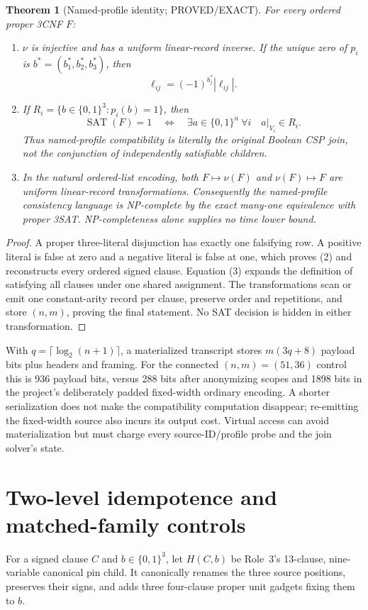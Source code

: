 \documentclass[11pt]{article}
\newtheorem{theorem}{Theorem}
\newcommand{\SAT}{\operatorname{SAT}}
\begin{document}
\begin{theorem}[Named-profile identity; PROVED/EXACT]
For every ordered proper 3CNF $F$:
\begin{enumerate}
\item $\nu$ is injective and has a uniform linear-record inverse.  If the
unique zero of $p_i$ is $b^*=(b_1^*,b_2^*,b_3^*)$, then
\[
 \ell_{ij}=(-1)^{b_j^*}|\ell_{ij}|.
\tag{2}
\]
\item If $R_i=\{b\in\{0,1\}^3:p_i(b)=1\}$, then
\[
 \SAT(F)=1\quad\Longleftrightarrow\quad
 \exists a\in\{0,1\}^n\ \forall i\quad a|_{V_i}\in R_i.
\tag{3}
\]
Thus named-profile compatibility is literally the original Boolean CSP
join, not the conjunction of independently satisfiable children.
\item In the natural ordered-list encoding, both $F\mapsto\nu(F)$ and
$\nu(F)\mapsto F$ are uniform linear-record transformations.  Consequently
the named-profile consistency language is NP-complete by the exact
many-one equivalence with proper 3SAT.  NP-completeness alone supplies no
time lower bound.
\end{enumerate}
\end{theorem}
\begin{proof}
A proper three-literal disjunction has exactly one falsifying row.  A
positive literal is false at zero and a negative literal is false at one,
which proves (2) and reconstructs every ordered signed clause.  Equation
(3) expands the definition of satisfying all clauses under one shared
assignment.  The transformations scan or emit one constant-arity record
per clause, preserve order and repetitions, and store $(n,m)$, proving the
final statement.  No SAT decision is hidden in either transformation.
\end{proof}

With $q=\lceil\log_2(n+1)\rceil$, a materialized transcript stores
$m(3q+8)$ payload bits plus headers and framing.  For the connected
$(n,m)=(51,36)$ control this is 936 payload bits, versus 288 bits after
anonymizing scopes and 1898 bits in the project's deliberately padded
fixed-width ordinary encoding.  A shorter serialization does not make the
compatibility computation disappear; re-emitting the fixed-width source
also incurs its output cost.  Virtual access can avoid materialization but
must charge every source-ID/profile probe and the join solver's state.

\section{Two-level idempotence and matched-family controls}
For a signed clause $C$ and $b\in\{0,1\}^3$, let $H(C,b)$ be Role~3's
13-clause, nine-variable canonical pin child.  It canonically renames the
three source positions, preserves their signs, and adds three four-clause
proper unit gadgets fixing them to $b$.
\end{document}
